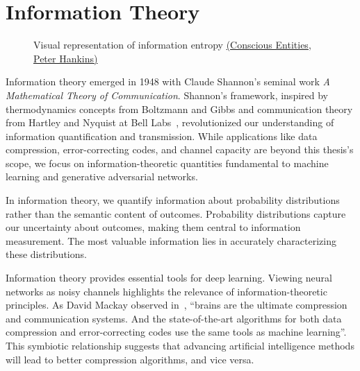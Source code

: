 \section{Information Theory}%
\label{sec:information-theory}
\vspace{0.5cm}
\begin{figure}[h!]%
	\label{fig:info}
	\centering
	\caption{Visual representation of information entropy \href{https://www.consciousentities.com/2017/02/consciousness-entropy/}{(Conscious Entities, Peter Hankins)}}
\end{figure}
\vspace{0.5cm}
Information theory emerged in 1948 with Claude Shannon's seminal work \textit{A Mathematical Theory of Communication}. Shannon's framework, inspired by thermodynamics concepts from Boltzmann and Gibbs and communication theory from Hartley and Nyquist at Bell Labs~\cite{ref:losee-1997}, revolutionized our understanding of information quantification and transmission. While applications like data compression, error-correcting codes, and channel capacity are beyond this thesis's scope, we focus on information-theoretic quantities fundamental to machine learning and generative adversarial networks.
\begin{remark}
	In information theory, we quantify information about probability distributions rather than the semantic content of outcomes. Probability distributions capture our uncertainty about outcomes, making them central to information measurement. The most valuable information lies in accurately characterizing these distributions.
\end{remark}
Information theory provides essential tools for deep learning. Viewing neural networks as noisy channels highlights the relevance of information-theoretic principles. As David Mackay observed in~\cite{ref:mackay-2003}, ``brains are the ultimate compression and communication systems. And the state-of-the-art algorithms for both data compression and error-correcting codes use the same tools as machine learning''. This symbiotic relationship suggests that advancing artificial intelligence methods will lead to better compression algorithms, and vice versa.
